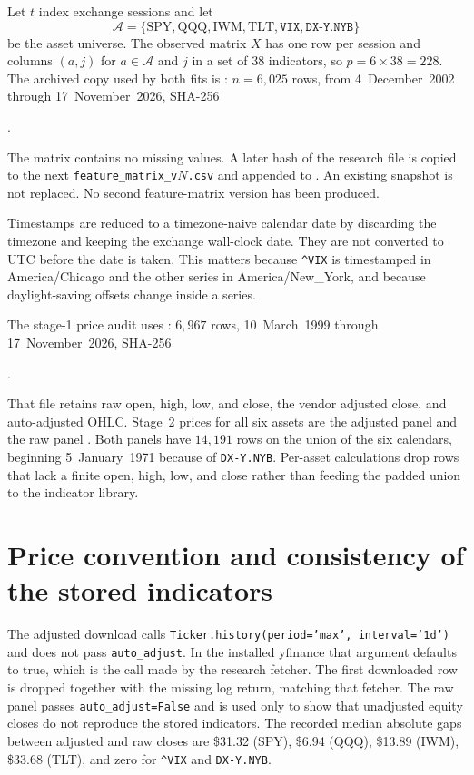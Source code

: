 \documentclass[11pt]{article}
\begin{document}
Let \(t\) index exchange sessions and let
\[
\mathcal{A}=\{\mathrm{SPY},\mathrm{QQQ},\mathrm{IWM},\mathrm{TLT},\texttt{\^{}VIX},\texttt{DX-Y.NYB}\}
\]
be the asset universe.
The observed matrix \(X\) has one row per session and columns \((a,j)\) for \(a\in\mathcal{A}\) and \(j\) in a set of \(38\) indicators, so \(p=6\times 38=228\).
The archived copy used by both fits is :
\(n=6{,}025\) rows, from 4~December~2002 through 17~November~2026, SHA-256
\begin{center}
.
\end{center}
The matrix contains no missing values.
A later hash of the research file is copied to the next \texttt{feature\_matrix\_v\(N\).csv} and appended to .
An existing snapshot is not replaced.
No second feature-matrix version has been produced.

Timestamps are reduced to a timezone-naive calendar date by discarding the timezone and keeping the exchange wall-clock date.
They are not converted to UTC before the date is taken.
This matters because \texttt{\^{}VIX} is timestamped in America/Chicago and the other series in America/New\_York, and because daylight-saving offsets change inside a series.

The stage-1 price audit uses : \(6{,}967\) rows, 10~March~1999 through 17~November~2026, SHA-256
\begin{center}
.
\end{center}
That file retains raw open, high, low, and close, the vendor adjusted close, and auto-adjusted OHLC.
Stage~2 prices for all six assets are the adjusted panel  and the raw panel .
Both panels have \(14{,}191\) rows on the union of the six calendars, beginning 5~January~1971 because of \texttt{DX-Y.NYB}.
Per-asset calculations drop rows that lack a finite open, high, low, and close rather than feeding the padded union to the indicator library.

\section{Price convention and consistency of the stored indicators}
\label{sec:prices}

The adjusted download calls \texttt{Ticker.history(period='max', interval='1d')} and does not pass \texttt{auto\_adjust}.
In the installed yfinance that argument defaults to true, which is the call made by the research fetcher.
The first downloaded row is dropped together with the missing log return, matching that fetcher.
The raw panel passes \texttt{auto\_adjust=False} and is used only to show that unadjusted equity closes do not reproduce the stored indicators.
The recorded median absolute gaps between adjusted and raw closes are \$31.32 (SPY), \$6.94 (QQQ), \$13.89 (IWM), \$33.68 (TLT), and zero for \texttt{\^{}VIX} and \texttt{DX-Y.NYB}.
\end{document}
